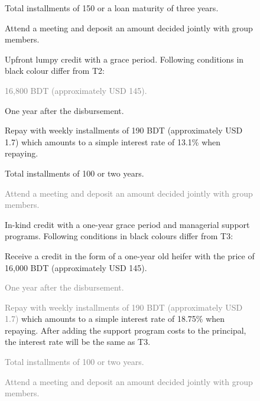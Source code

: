 \begin{figure}
{{\begin{description}
\begin{description}
{		\item[Maturity]	Total installments of 150 or a loan maturity of three years.
		\item[Weekly obligations]	Attend a meeting and deposit an amount decided jointly with group members.}
		\end{description}
	\item[T3]	Upfront lumpy credit with a grace period. Following conditions in black colour differ from \textsf{T2}:
		\begin{description}
		\vspace{1ex}\setlength{\itemsep}{.5ex}\setlength{\baselineskip}{8pt}
		\item[\textcolor{gray}{Credit}]	\textcolor{gray}{16,800 BDT (approximately USD 145).}
		\item[Repayment start]	One year after the disbursement.
		\item[Installments]	Repay with weekly installments of 190 BDT (approximately USD 1.7) which amounts to a simple interest rate of 13.1\% when repaying.
		\item[Maturity]	Total installments of 100 or two years. 
		\item[\textcolor{gray}{Weekly obligations}]	\textcolor{gray}{Attend a meeting and deposit an amount decided jointly with group members.}
		\end{description}
	\item[T4]	In-kind credit with a one-year grace period and managerial support programs. Following conditions in black colours differ from \textsf{T3}:
		\begin{description}
		\vspace{1ex}\setlength{\itemsep}{.5ex}\setlength{\baselineskip}{8pt}
		\item[Credit]	Receive a credit in the form of a one-year old heifer with the price of 16,000 BDT (approximately USD 145).
		\item[\textcolor{gray}{Repayment start}]	\textcolor{gray}{One year after the disbursement.}
		\item[\textcolor{gray}{Installments}]	\textcolor{gray}{Repay with weekly installments of 190 BDT (approximately USD 1.7)} which amounts to a simple interest rate of 18.75\% when repaying. After adding the support program costs to the principal, the interest rate will be the same as \textsf{T3}.
		\item[\textcolor{gray}{Maturity}]	\textcolor{gray}{Total installments of 100 or two years. }
		\item[\textcolor{gray}{Weekly obligations}]	\textcolor{gray}{Attend a meeting and deposit an amount decided jointly with group members.}

\end{description}
\end{description}}}
\end{figure}
